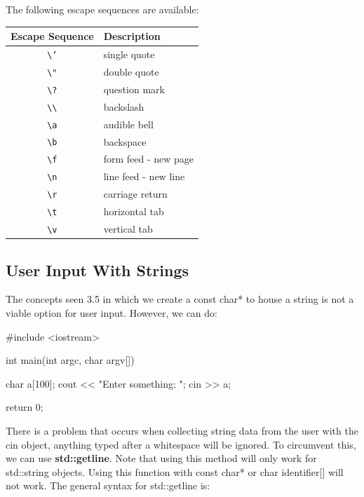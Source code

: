 \documentclass{report}
\begin{document}
    The following escape sequences are available:
    \begin{center}
    \begin{tabular}{|c|l|}
        \hline
        \textbf{Escape Sequence} & \textbf{Description} \\
        \hline
        \texttt{\textbackslash'} & single quote \\
        \texttt{\textbackslash"} & double quote \\
        \texttt{\textbackslash?} & question mark \\
        \texttt{\textbackslash\textbackslash} & backslash \\
        \texttt{\textbackslash a} & audible bell \\
        \texttt{\textbackslash b} & backspace \\
        \texttt{\textbackslash f} & form feed - new page \\
        \texttt{\textbackslash n} & line feed - new line \\
        \texttt{\textbackslash r} & carriage return \\
        \texttt{\textbackslash t} & horizontal tab \\
        \texttt{\textbackslash v} & vertical tab \\
        \hline
        \end{tabular}
    \end{center}


    \pagebreak
    \subsection{User Input With Strings}
    \bigbreak \noindent 
    \begin{remark}
        The concepts seen 3.5 in which we create a const char* to house a string is not a viable option for user input. However, we can do:
    \end{remark}

        \bigbreak \noindent 
        
        \begin{cppcode}
#include <iostream>

int main(int argc, char argv[]){

    char a[100];
    cout << "Enter something: ";
    cin >> a;

    return 0;
}
        \end{cppcode}
        
    \bigbreak \noindent 
    \bigbreak \noindent 
    There is a problem that occurs when collecting string data from the user with the cin object, anything typed after a whitespace will be ignored. To circumvent this, we can use \textbf{std::getline}. Note that using this method will only work for std::string objects. Using this function with const char* or char identifier[] will not work.
    \bigbreak \noindent 
    The general syntax for std::getline is:
    \smallbreak \noindent
    
\end{document}
